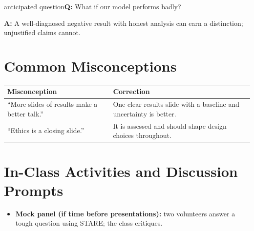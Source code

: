 \documentclass[11pt]{article}
\begin{document}
\begin{question}{anticipated question}\textbf{Q:} What if our model performs badly?\par\smallskip\textbf{A:} A well-diagnosed negative result with honest analysis can earn a distinction; unjustified claims cannot.\end{question}

\section{Common Misconceptions}\begin{center}\small\renewcommand{\arraystretch}{1.35}\begin{tabularx}{\textwidth}{@{}>{\raggedright\arraybackslash}X >{\raggedright\arraybackslash}X@{}}\toprule\textbf{Misconception} & \textbf{Correction}\\\midrule``More slides of results make a better talk.'' & One clear results slide with a baseline and uncertainty is better.\\
``Ethics is a closing slide.'' & It is assessed and should shape design choices throughout.\\\bottomrule\end{tabularx}\end{center}

\section{In-Class Activities and Discussion Prompts}\label{sec:act}\begin{itemize}\item \textbf{Mock panel (if time before presentations):} two volunteers answer a tough question using STARE; the class critiques.\end{itemize}
\end{document}
